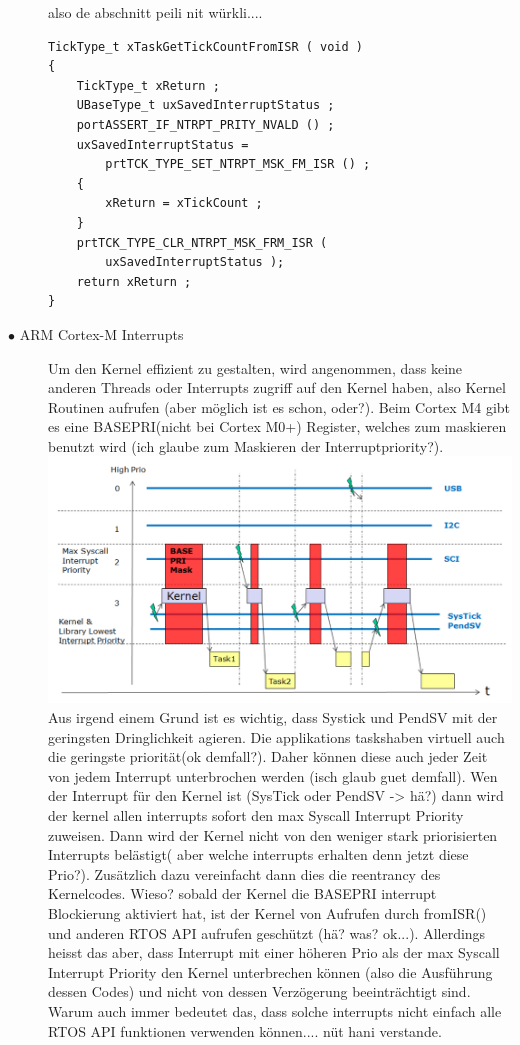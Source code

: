 \documentclass[a4paper, 8pt]{extarticle}
\begin{document}
\begin{multicols*}{3}
\begin{description}
							also de abschnitt peili nit würkli....
							\begin{lstlisting}
TickType_t xTaskGetTickCountFromISR ( void )
{
	TickType_t xReturn ;
	UBaseType_t uxSavedInterruptStatus ;
	portASSERT_IF_NTRPT_PRITY_NVALD () ;
	uxSavedInterruptStatus =
		prtTCK_TYPE_SET_NTRPT_MSK_FM_ISR () ;		
	{
		xReturn = xTickCount ;
	}
	prtTCK_TYPE_CLR_NTRPT_MSK_FRM_ISR (
		uxSavedInterruptStatus );
	return xReturn ;
}
							\end{lstlisting} 
					\item[$\bullet$ ARM Cortex-M Interrupts]
							Um den Kernel effizient zu gestalten, wird angenommen, dass keine anderen Threads oder Interrupts zugriff auf den Kernel
							haben, also Kernel Routinen aufrufen (aber möglich ist es schon, oder?). Beim Cortex M4 gibt es eine BASEPRI(nicht bei Cortex M0+) Register, welches
							zum maskieren benutzt wird (ich glaube zum Maskieren der Interruptpriority?).
							\includegraphics[width=0.6\linewidth,left]{img/ARM_Interrupt_Priorities.PNG}
							Aus irgend einem Grund ist es wichtig, dass Systick und PendSV mit der geringsten Dringlichkeit agieren. Die applikations taskshaben virtuell
							auch die geringste priorität(ok demfall?). Daher können diese auch jeder Zeit von jedem Interrupt unterbrochen werden (isch glaub guet demfall).
							Wen der Interrupt für den Kernel ist (SysTick oder PendSV -> hä?) dann wird der kernel allen interrupts sofort den max Syscall Interrupt Priority zuweisen.
							Dann wird der Kernel nicht von den weniger stark priorisierten Interrupts belästigt( aber welche interrupts erhalten denn jetzt diese Prio?). Zusätzlich dazu 
							vereinfacht dann dies die reentrancy des Kernelcodes. Wieso? sobald der Kernel die BASEPRI interrupt Blockierung aktiviert hat,  ist der Kernel von Aufrufen durch fromISR()
							und anderen RTOS API aufrufen geschützt (hä? was? ok...). Allerdings heisst das aber, dass Interrupt mit einer höheren Prio als der max Syscall Interrupt Priority den Kernel 
							unterbrechen können (also die Ausführung dessen Codes) und nicht von dessen Verzögerung beeinträchtigt sind. Warum auch immer bedeutet das, dass solche interrupts nicht  
							einfach alle RTOS API funktionen verwenden können.... nüt hani verstande.


				\end{description}
		




\end{multicols*}
\end{document}
